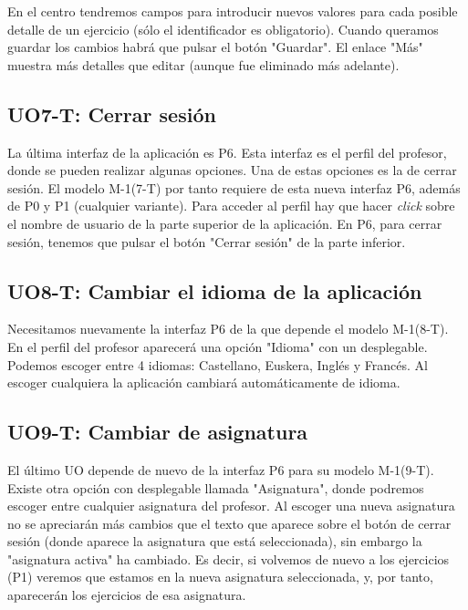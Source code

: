 En el centro tendremos campos para introducir nuevos valores para cada posible detalle de un ejercicio (sólo el identificador es obligatorio). Cuando queramos guardar los cambios habrá que pulsar el botón "Guardar". El enlace "Más" muestra más detalles que editar (aunque fue eliminado más adelante).\\

\subsection{UO7-T: Cerrar sesión}
\label{analisis-de-requisitos:funcionales:uo7t}

La última interfaz de la aplicación es P6. Esta interfaz es el perfil del profesor, donde se pueden realizar algunas opciones. Una de estas opciones es la de cerrar sesión. El modelo M-1(7-T) por tanto requiere de esta nueva interfaz P6, además de P0 y P1 (cualquier variante). Para acceder al perfil hay que hacer \textit{click} sobre el nombre de usuario de la parte superior de la aplicación. En P6, para cerrar sesión, tenemos que pulsar el botón "Cerrar sesión" de la parte inferior.\\

\subsection{UO8-T: Cambiar el idioma de la aplicación}
\label{analisis-de-requisitos:funcionales:uo8t}

Necesitamos nuevamente la interfaz P6 de la que depende el modelo M-1(8-T). En el perfil del profesor aparecerá una opción "Idioma" con un desplegable. Podemos escoger entre 4 idiomas: Castellano, Euskera, Inglés y Francés. Al escoger cualquiera la aplicación cambiará automáticamente de idioma.\\

\subsection{UO9-T: Cambiar de asignatura}
\label{analisis-de-requisitos:funcionales:uo9t}

El último UO depende de nuevo de la interfaz P6 para su modelo M-1(9-T). Existe otra opción con desplegable llamada "Asignatura", donde podremos escoger entre cualquier asignatura del profesor. Al escoger una nueva asignatura no se apreciarán más cambios que el texto que aparece sobre el botón de cerrar sesión (donde aparece la asignatura que está seleccionada), sin embargo la "asignatura activa" ha cambiado. Es decir, si volvemos de nuevo a los ejercicios (P1) veremos que estamos en la nueva asignatura seleccionada, y, por tanto, aparecerán los ejercicios de esa asignatura.\\

